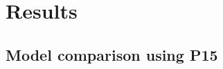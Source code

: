 \graphicspath{{images/}}

\section{Results}
\label{sec:results}






\subsection{Model comparison using P15}
\label{sec:P15_fit}

